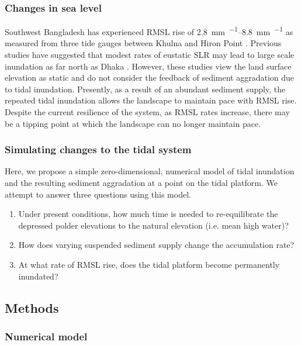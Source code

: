 \documentclass{wscpaperproc}
\theoremstyle{wsc}
\begin{document}
\subsubsection*{Changes in sea level}

Southwest Bangladesh has experienced RMSL rise of \SIrange{2.8}{8.8}{\milli\meter\per\year} as measured from three tide gauges between Khulna and Hiron Point \cite{pethickRapidRiseEffective2013}. Previous studies have suggested that modest rates of eustatic SLR may lead to large scale inundation as far north as Dhaka \cite{huqSeaLevelRiseBangladesh1995,aliVulnerabilityBangladeshClimate1996,sarwarImpactsSeaLevel2005}. However, these studies view the land surface elevation as static and do not consider the feedback of sediment aggradation due to tidal inundation. Presently, as a result of an abundant sediment supply, the repeated tidal inundation allows the landscape to maintain pace with RMSL rise. Despite the current resilience of the system, as RMSL rates increase, there may be a tipping point at which the landscape can no longer maintain pace.

\subsubsection*{Simulating changes to the tidal system}

Here, we propose a simple zero-dimensional, numerical model of tidal inundation and the resulting sediment aggradation at a point on the tidal platform. We attempt to answer three questions using this model.

\begin{enumerate}
	\item Under present conditions, how much time is needed to re-equilibrate the depressed polder elevations to the natural elevation (i.e. mean high water)?
	\item How does varying suspended sediment supply change the accumulation rate?
	\item At what rate of RMSL rise, does the tidal platform become permanently inundated?
\end{enumerate}

\subsection{Methods}

\subsubsection*{Numerical model}
\end{document}
